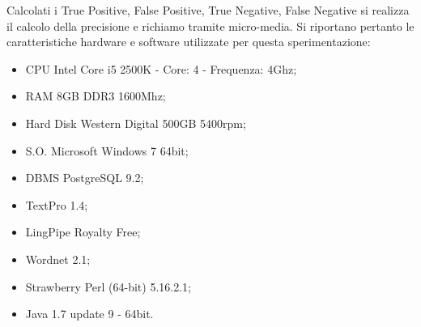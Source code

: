 Calcolati i True Positive, False Positive, True Negative, False Negative si realizza il calcolo della precisione e richiamo tramite micro-media.
Si riportano pertanto le caratteristiche hardware e software utilizzate per questa sperimentazione:
\begin{itemize}
	\item CPU Intel Core i5 2500K - Core: 4 - Frequenza: 4Ghz;
	\item RAM 8GB DDR3 1600Mhz;
	\item Hard Disk Western Digital 500GB 5400rpm;
	\item S.O. Microsoft Windows 7 64bit;
	\item DBMS PostgreSQL 9.2;
	\item TextPro 1.4;
	\item LingPipe Royalty Free;
	\item Wordnet 2.1;
	\item Strawberry Perl (64-bit) 5.16.2.1;
	\item Java 1.7 update 9 - 64bit.
\end{itemize}

